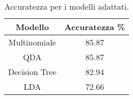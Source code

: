 \begin{table}[H]
\centering
\caption{Accuratezza per i modelli adattati.}
\begin{tabular}{cc}
\toprule
       Modello &  Accuratezza \% \\
\midrule
 Multinomiale &          85.87 \\
           QDA &          85.87 \\
 Decision Tree &          82.94 \\
           LDA &          72.66 \\
\bottomrule
\end{tabular}
\label{tab:acc}
\end{table}